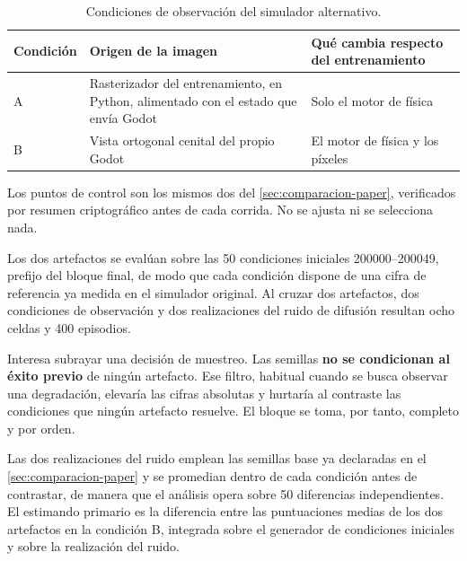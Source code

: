 \begin{table}[htbp]
  \centering
  \caption{Condiciones de observaci\'on del simulador alternativo.}
  \label{tab:godot-condiciones}
  \small
  \scriptsize
  \begin{tabular}{p{16mm} p{44mm} p{50mm}}
    \toprule
    Condici\'on & Origen de la imagen & Qu\'e cambia respecto del entrenamiento \\
    \midrule
    A & Rasterizador del entrenamiento, en Python, alimentado con el estado que
      env\'ia Godot & Solo el motor de f\'isica \\
    B & Vista ortogonal cenital del propio Godot & El motor de f\'isica y los p\'ixeles \\
    \bottomrule
  \end{tabular}
\end{table}

Los puntos de control son los mismos dos del \cref{sec:comparacion-paper}, verificados por
resumen criptogr\'afico antes de cada corrida. No se ajusta ni se selecciona nada.


Los dos artefactos se eval\'uan sobre las \num{50} condiciones iniciales
\numrange{200000}{200049}, prefijo del bloque final, de modo que cada condici\'on dispone de
una cifra de referencia ya medida en el simulador original. Al cruzar dos artefactos, dos
condiciones de observaci\'on y dos realizaciones del ruido de difusi\'on resultan ocho celdas
y \num{400} episodios.

Interesa subrayar una decisi\'on de muestreo. Las semillas \textbf{no se condicionan al
\'exito previo} de ning\'un artefacto. Ese filtro, habitual cuando se busca observar una
degradaci\'on, elevar\'ia las cifras absolutas y hurtar\'ia al contraste las condiciones que
ning\'un artefacto resuelve. El bloque se toma, por tanto, completo y por orden.

Las dos realizaciones del ruido emplean las semillas base ya declaradas en el
\cref{sec:comparacion-paper} y se promedian dentro de cada condici\'on antes de contrastar,
de manera que el an\'alisis opera sobre \num{50} diferencias independientes. El estimando
primario es la diferencia entre las puntuaciones medias de los dos artefactos en la
condici\'on B, integrada sobre el generador de condiciones iniciales y sobre la realizaci\'on
del ruido.

